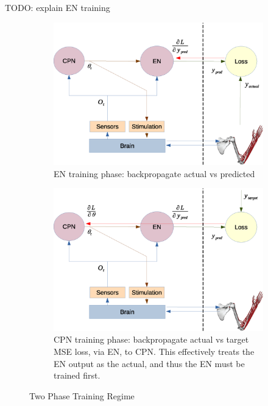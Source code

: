 \documentclass[12pt]{iopart}
\begin{document}
TODO: explain EN training

\begin{figure}
	\centering
	\begin{subfigure}[c]{0.48\textwidth}
		\centering
		\includegraphics[width=\textwidth]{backprop_en.eps}
		\caption{EN training phase: backpropagate actual vs predicted}
	\end{subfigure}
	\hfill
	\begin{subfigure}[c]{0.48\textwidth}
		\centering
		\includegraphics[width=\textwidth]{backprop_cpn.eps}
		\caption{CPN training phase: backpropagate actual vs target MSE loss, via EN, to CPN. This effectively treats the EN output as the actual, and thus the EN must be trained first.}
	\end{subfigure}
	\hfill
\caption{Two Phase Training Regime}
\label{fig:training}
\end{figure}
\end{document}
